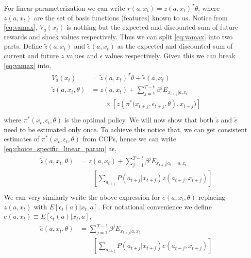 \documentclass{article}
\begin{document}
For linear parameterization we can write $r(a, x_t) = z(a, x_t)^T\theta$, where $z(a, x_t)$ are the set of basis functions (features) known to us.
Notice from \eqref{eq:vamax}, $V_a(x_t)$ is nothing but the expected and discounted sum of future rewards and shock values respectively. Thus we can split \eqref{eq:vamax} into two parts.
Define $\tilde{z}(a, x_t)$ and $\tilde{e}(a, x_t)$ as the expected and discounted sum of current and future $z$ values and $\epsilon$ values respectively. Given this we can break \eqref{eq:vamax} into,
\begin{align}\label{eq:choice_specific_linear_param}
\begin{split}
V_a(x_t) & = \tilde{z}(a, x_t)^T \theta + \tilde{e}(a, x_t) \\
\tilde{z}(a, x_{t}, \theta) & = z(a, x_{t}) + \sum_{j=1}^{T-t}\beta^{j} E_{x_{t+j}|a,x_t} \\
& \qquad \times \left[ z\left(\pi^{*}\big( x_{t+j}, \epsilon_{t+j}, \theta \right), x_{t+j} \big) \right] \\
\end{split}
\end{align}
where $\pi^{*}(x_{t}, \epsilon_{t}, \theta)$ is the optimal policy. We will now show that both $\tilde{z}$ and $\tilde{e}$ need to be estimated only once.
To achieve this notice that, we can get consistent estimates of $\pi^{*}(x_t, \epsilon_t, \theta)$ from CCPs, hence we can write \eqref{eq:choice_specific_linear_param} as,
\begin{align}\label{eq:z_tilde_ccp}
\begin{split}
  \tilde{z}(a, x_{t}, \theta) & = z(a, x_t) + \sum_{j=1}^{T-t} \beta^{j} E_{x_{t+j}|a_t=a, x_t} \\
  & \qquad \left[ \sum_{a_{t+j}} P(a_{t+j}|x_{t+j}) z(a_{t+j}, x_{t+j}) \right] \\
  \end{split}
\end{align}
We can very similarly write the above expression for $\tilde{e}(a, x_t, \theta)$ replacing $z(a, x_t)$ with $E[\epsilon_t(a)|x_t, a]$. For notational convenience we define $e(a, x_t) \equiv E[\epsilon_t(a)|x_t, a]$,
\begin{align}\label{eq:e_tilde}
\begin{split}
  \tilde{e}(a, x_{t}, \theta) & = \sum_{j=1}^{T-t}\beta^{j} E_{x_{t+j}|a,x_t} \\
  & \qquad \left[ \sum_{a_{t+j}} P(a_{t+j}|x_{t+j}) e(a_{t+j}, x_{t+j}) \right] \\
  \end{split}
\end{align}
\end{document}
